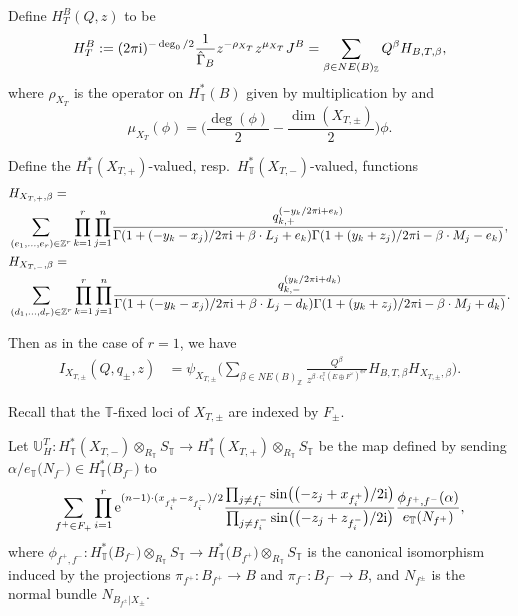 \documentclass[pdftex]{sigma}
\numberwithin{equation}{section}
\newcommand{\ZZ}{\mathbb{Z}}
\newcommand{\UU}{\mathbb{U}}
\newcommand{\torus}{\mathbb{T}}
\newcommand{\F}{F}
\newcommand{\E}{E}
\newcommand{\MB}{M}
\newcommand{\LB}{L}
\newcommand{\z}{z}
\newcommand{\x}{x}
\newcommand{\y}{y}
\begin{document}
Define $H^B_T(Q ,z)$ to be
\begin{align*} H^B_T := (2 \pi {\rm i})^{-\deg_0/2}\frac{1}{\hat \Gamma_B} z^{- \rho_{X_T}} z^{\mu_{X_T}} J^B
 =
\sum_{\beta \in NE(B)_\ZZ} Q^\beta H_{B, T, \beta},\end{align*}
where $\rho_{X_T}$ is the operator on $H^*_\torus(B)$ given by multiplication by \smash{$c_1^\torus\bigl(TB \oplus \bigl(E \oplus F^\vee\bigr)^{\oplus r}\bigr)$} and
\[
\mu_{X_T}(\phi) = \biggl( \frac{\deg(\phi)}{2} -\frac{ \dim(X_{T, \pm})}{2} \biggr) \phi.
\]

Define the $H^*_\torus(X_{T,+})$-valued, resp.\ $H^*_\torus(X_{T,-})$-valued, functions
\begin{align*}
&H_{X_{T, +}, \beta} =\\ &
\sum_{(e_1, \dots, e_r) \in \ZZ^r} \prod_{k=1}^r\prod_{j=1}^n \!\frac{q_{k, +}^{(-\y_k/2 \pi {\rm i} + e_k)}}
 {\Gamma(1+(-\y_k-\x_j)/2 \pi {\rm i}+\beta\cdot \LB_j+e_k)\Gamma(1+(\y_k+\z_j)/2 \pi {\rm i}-\beta\cdot \MB_j-e_k)},
\\
&H_{X_{T, -}, \beta} = \\ & \sum_{(d_1, \dots, d_r) \in \ZZ^r} \prod_{k=1}^r \prod_{j=1}^n\!\frac{q_{k, -}^{(\y_k/2 \pi {\rm i} + d_k)} }{\Gamma(1+(-\y_k-\x_j)/2 \pi {\rm i}+\beta\cdot \LB_j - d_k)\Gamma(1+(\y_k+\z_j)/2 \pi {\rm i}-\beta\cdot \MB_j + d_k)}.
\end{align*}

Then as in the case of $r=1$, we have
\begin{align*}%
I_{X_{T, \pm}}(Q, q_\pm, z) &{}= \psi_{X_{T,\pm}} \biggl( \sum_{\beta \in NE(B)_\ZZ} \frac{Q^\beta}{z^{\beta \cdot c_1^\torus(\E \oplus \F^\vee)^{\oplus r}}} H_{B, T, \beta} H_{X_{T, \pm}, \beta} \biggr).
\end{align*}



Recall that the $\torus$-fixed loci of $X_{T, \pm}$ are indexed by $F_\pm$.

Let $\UU_H^T\colon H^*_\torus(X_{T,-})\otimes_{R_\torus} S_\torus \to H^*_\torus(X_{T,+})\otimes_{R_\torus} S_\torus$ be the map defined by sending
$\alpha/e_\torus\bigl(N_{f^-}\bigr) \in H^*_\torus\bigl(B_{f^-}\bigr)$ to
\[
\sum_{f^+ \in F_+} \prod_{i=1}^r {\rm e}^{ (n-1)\cdot ( \x_{f^+_i}- \z_{f^-_i})/2 }\frac{ \prod_{j\neq {f^-_i}} \sin\bigl( \bigl(-\z_j+\x_{f^+_i}\bigr)/2 {\rm i}\bigr) }{\prod_{j \neq {f^-_i}}\sin\bigl(\bigl(-\z_j + \z_{f^-_i}\bigr)/2 {\rm i}\bigr)} \frac{\phi_{f^+, f^-}(\alpha)}{e_\torus(N_{f^+})},
\]
where $\phi_{f^+, f^-}\colon H^*_\torus\bigl(B_{f^-}\bigr)\otimes_{R_\torus} S_\torus \to H^*_\torus\bigl(B_{f^+}\bigr)\otimes_{R_\torus} S_\torus$ is the canonical isomorphism induced by the projections $\pi_{f^+}\colon B_{f^+} \to B$ and $\pi_{f^-}\colon B_{f^-} \to B$, and $N_{f^\pm}$ is the normal bundle $N_{B_{f^\pm}|X_\pm}$.
\end{document}
